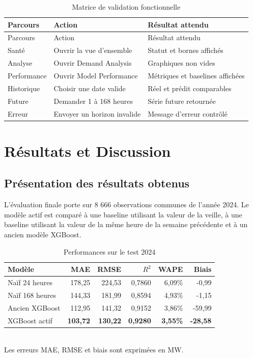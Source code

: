 \documentclass[12pt,a4paper]{report}
\begin{document}
\begin{longtable}{p{} p{} p{}}
\caption{Matrice de validation fonctionnelle}\label{tab:validation-fonctionnelle}\\
\toprule
Parcours & Action & Résultat attendu \\
\midrule
\endfirsthead
\toprule
Parcours & Action & Résultat attendu \\
\midrule
\endhead
Santé & Ouvrir la vue d'ensemble & Statut et bornes affichés \\
Analyse & Ouvrir Demand Analysis & Graphiques non vides \\
Performance & Ouvrir Model Performance & Métriques et baselines affichées \\
Historique & Choisir une date valide & Réel et prédit comparables \\
Future & Demander 1 à 168 heures & Série future retournée \\
Erreur & Envoyer un horizon invalide & Message d'erreur contrôlé \\
\bottomrule
\end{longtable}

\chapter{Résultats et Discussion}

\section{Présentation des résultats obtenus}

L'évaluation finale porte sur 8 666 observations communes de l'année 2024.
Le modèle actif est comparé à une baseline utilisant la valeur de la veille,
à une baseline utilisant la valeur de la même heure de la semaine précédente
et à un ancien modèle XGBoost.

\begin{table}[htbp]
	\centering
	\caption{Performances sur le test 2024}
	\label{tab:performances-2024}
	\begin{tabular}{lrrrrr}
		\toprule
		Modèle & MAE & RMSE & $R^2$ & WAPE & Biais \\
		\midrule
		Naïf 24 heures & 178,25 & 224,53 & 0,7860 & 6,09\% & -0,99 \\
		Naïf 168 heures & 144,33 & 181,99 & 0,8594 & 4,93\% & -1,15 \\
		Ancien XGBoost & 112,95 & 141,32 & 0,9152 & 3,86\% & -59,99 \\
		XGBoost actif & \textbf{103,72} & \textbf{130,22} & \textbf{0,9280} & \textbf{3,55\%} & \textbf{-28,58} \\
		\bottomrule
	\end{tabular}
	\\[0.2cm]
	\small Les erreurs MAE, RMSE et biais sont exprimées en MW.
\end{table}
\end{document}
